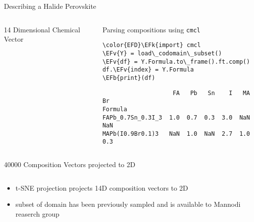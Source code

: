 \documentclass[10pt, aspectratio=169, presentation]{beamer}
\newcommand{\EFk}[1]{\textcolor{EFk}{#1}} %
\newcommand{\EFb}[1]{\textcolor{EFb}{#1}} %
\newcommand{\EFv}[1]{\textcolor{EFv}{#1}} %
\begin{document}
\begin{frame}[label={sec:orgbc7713d},fragile]{Describing a Halide Perovskite}
 \begin{columns}
\begin{column}{0.4\columnwidth}
\begin{block}{14 Dimensional Chemical Vector}
 
\begin{center}

\end{center}
\end{block}
\end{column}

\begin{column}{0.6\columnwidth}
\begin{block}{Parsing compositions using \texttt{cmcl}}
\begin{Code}
\begin{Verbatim}
\color{EFD}\EFk{import} cmcl
\EFv{Y} = load\_codomain\_subset()
\EFv{df} = Y.Formula.to\_frame().ft.comp()
df.\EFv{index} = Y.Formula
\EFb{print}(df)
\end{Verbatim}
\end{Code}

\begin{small}
\begin{verbatim}
                    FA   Pb   Sn    I   MA   Br
Formula                                        
FAPb_0.7Sn_0.3I_3  1.0  0.7  0.3  3.0  NaN  NaN
MAPb(I0.9Br0.1)3   NaN  1.0  NaN  2.7  1.0  0.3
\end{verbatim}
\end{small}
\end{block}
\end{column}
\end{columns}
\end{frame}

\begin{frame}[label={sec:org06edba0}]{40000 Composition Vectors projected to 2D}
\begin{columns}
\begin{column}{0.4\columnwidth}
\begin{itemize}
\item t-SNE projection projects 14D composition vectors to 2D
\item subset of domain has been previously sampled and is available to
Mannodi reaserch group
\autocite{yang-2023-high-throug}
\end{itemize}
\end{column}

\begin{column}{0.6\columnwidth}
 
\begin{center}

\end{center}
\end{column}
\end{columns}
\end{frame}
\end{document}
